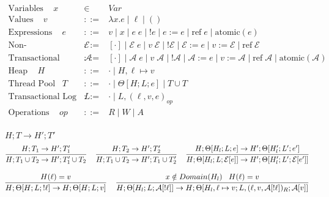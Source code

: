 \documentclass[9pt]{article}
\newcommand{\aeval}[1]{\mathcal{A}[#1]}
\newcommand{\actxt}[0]{\mathcal{A}}
\newcommand{\eval}[1]{\mathcal{E}[#1]}
\newcommand{\ctxt}[0]{\mathcal{E}}
\newcommand{\loc}[0]{\ell}
\newcommand{\atomic}[1]{\text{atomic}(#1)}
\newcommand{\alloc}[1]{\text{ref} \; #1}
\begin{document}
\begin{displaymath}
\begin{array}{rcll}
\text{Variables } \;\;\; x &\in& Var \\
\text{Values } \;\;\; v &::=& \lambda x. e \; | \; \loc \; | \; () \\
\text{Expressions } \;\;\; e &::=& v \; | \; x \; | \; e \; e \; | \; !e \; | \; e := e \; | \; \alloc{e} \; | \; \atomic{e}\\
\text{Non-Transactional Context } \;\;\; \ctxt &::=& [\cdot] \; | \; \ctxt \; e \; | \; v \; \ctxt \; | \; ! \ctxt \; | \; \ctxt := e \; | \; v := \ctxt \; | \; \alloc{\ctxt}\\
\text{Transactional Context } \;\;\; \actxt &::=& [\cdot] \; | \; \actxt \; e \; | \; v \; \actxt \; | \; ! \actxt \; | \; \actxt := e \; | \; v := \actxt \; | \; \alloc{\actxt} \; | \; \atomic{\actxt} \\
\text{Heap } \;\;\; H &::=& \cdot \; | \; H, \loc \mapsto v \\
\text{Thread Pool} \;\;\; T &::=& \cdot \; | \; \Theta[H; L; e] \; | \; T \cup T \\
\text{Transactional Log } \;\;\; L &::=& \cdot \; | \; L, (\loc, v, e)_{op} \\
\text{Operations } \;\;\; op &::=& R \; | \; W \; | \; A \\
\end{array}
\end{displaymath}


$\boxed{H; T \rightarrow H' ;T'}$
\[
\infer[]{H; T_1 \cup T_2 \rightarrow H'; T_1' \cup T_2}{H; T_1 \rightarrow H'; T_1'} \;\;\;
\infer[]{H; T_1 \cup T_2 \rightarrow H'; T_1 \cup T_2'}{H; T_2 \rightarrow H'; T_2'} \;\;\; 
\infer[]{H; \Theta[H_l; L; \eval{e}] \rightarrow H'; \Theta[H_l'; L'; \eval{e'}]}{H; \Theta[H_l; L; e] \rightarrow H'; \Theta[H_l'; L'; e']}
\]

\[
\infer[]{H; \Theta[H; L; !\loc] \rightarrow H; \Theta[H; L; v]}{H(\loc) = v} \;\;\;
\infer[]{H; \Theta[H_l; L; \aeval{!\loc}] \rightarrow H; \Theta[H_l, \loc \mapsto v; L, (\loc, v, \aeval{!\loc})_R; \aeval{v}]}{x \notin Domain(H_l) \;\;\; H(\loc) = v } 
\]
\end{document}

